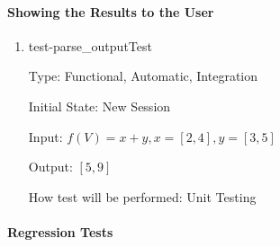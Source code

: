 \documentclass[12pt, titlepage]{article}
\begin{document}
\paragraph{Showing the Results to the User}

\begin{enumerate}
	
	\item{test-parse\_outputTest}
	
	Type: Functional, Automatic, Integration
	
	Initial State: New Session
	
	Input: $f(V) = x + y, x = [2,4], y = [3,5]$
	
	Output: $[5,9]$
	
	How test will be performed: Unit Testing\\
	
\end{enumerate}

\paragraph{Regression Tests}
\end{document}
